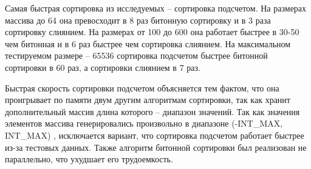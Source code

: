 Самая быстрая сортировка из исследуемых -- сортировка подсчетом. На размерах массива до 64 она превосходит в 8 раз битонную сортировку и в 3 раза сортировку слиянием. На размерах от 100 до 600 она работает быстрее в 30-50 чем битонная и в 6 раз быстрее чем сортировка слиянием. На максимальном тестируемом размере -- 65536 сортировка подсчетом быстрее битонной сортировки в 60 раз, а сортировки слиянием в 7 раз.  

Быстрая скорость сортировки подсчетом объясняется тем фактом, что она проигрывает по памяти двум другим алгоритмам сортировки, так как хранит дополнительный массив длина которого -- диапазон значений. Так как значения элементов массива генерировались произвольно в диапазоне (-INT\_MAX, INT\_MAX) \cite{si}, исключается вариант, что сортировка подсчетом работает быстрее из-за тестовых данных. Также алгоритм битонной сортировки был реализован не параллельно, что ухудшает его трудоемкость.

